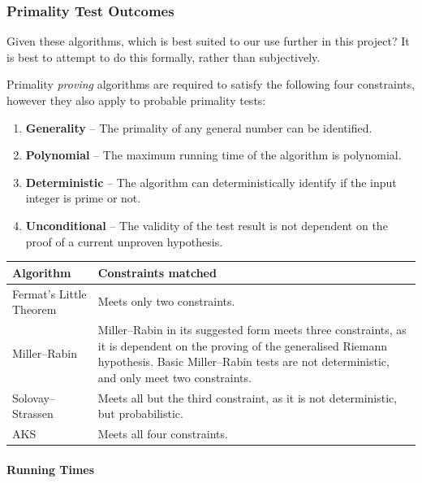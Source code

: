     \subsubsection{Primality Test Outcomes}
    
    Given these algorithms, which is best suited to our use further in this project? It is best to attempt to do this formally, rather than subjectively.
    
    Primality \emph{proving} algorithms are required to satisfy the following four constraints, however they also apply to probable primality tests:
    
    \begin{enumerate}
      \item \textbf{Generality} -- The primality of any general number can be identified.
      \item \textbf{Polynomial} -- The maximum running time of the algorithm is polynomial.
      \item \textbf{Deterministic} -- The algorithm can deterministically identify if the input integer is prime or not.
      \item \textbf{Unconditional} -- The validity of the test result is not dependent on the proof of a current unproven hypothesis.
    \end{enumerate}
    
    \begin{center}
        \begin{tabular}{ | l | p{7cm} |}
          \hline
          \textbf{Algorithm} & \textbf{Constraints matched}  \\ \hline
          Fermat's Little Theorem & Meets only two constraints. \\ \hline
          Miller--Rabin & Miller--Rabin in its suggested form meets three constraints, as it is dependent on the proving of the generalised Riemann hypothesis. Basic Miller--Rabin tests are not deterministic, and only meet two constraints. \\ \hline
          Solovay--Strassen &  Meets all but the third constraint, as it is not deterministic, but probabilistic.\\ \hline
          AKS & Meets all four constraints. \\ \hline
        \end{tabular}
      \end{center}
    
     \paragraph{Running Times}
      
